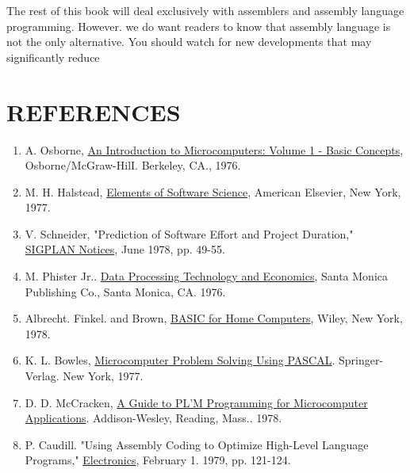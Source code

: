 \documentclass{book}
\begin{document}
The rest of this book will deal exclusively with assemblers and assembly language programming. However. we do want readers to know that assembly language is not the only alternative. You should watch for new developments that may significantly reduce
\pagebreak
\section*{REFERENCES}
\begin{enumerate}
\item{A. Osborne, \underline{An Introduction to Microcomputers: Volume 1 - Basic Concepts}, Osborne/McGraw-HilI. Berkeley, CA., 1976.}
\item{M. H. Halstead, \underline{Elements of Software Science}, American Elsevier, New York, 1977.}
\item{V. Schneider, "Prediction of Software Effort and Project Duration," \underline{SIGPLAN Notices}, June 1978, pp. 49-55.}
\item{M. Phister Jr.. \underline{Data Processing Technology and Economics}, Santa Monica Publishing Co., Santa Monica, CA. 1976.}
\item{Albrecht. Finkel. and Brown, \underline{BASIC for Home Computers}, Wiley, New York, 1978.}
\item{K. L. Bowles, \underline{Microcomputer Problem Solving Using PASCAL}. Springer-Verlag. New York, 1977.}
\item{D. D. McCracken, \underline{A Guide to PL'M Programming for Microcomputer Applications}. Addison-Wesley, Reading, Mass.. 1978.}
\item{P. Caudill. "Using Assembly Coding to Optimize High-Level Language Programs," \underline{Electronics}, February 1. 1979, pp. 121-124.}
\end{enumerate}
\end{document}
